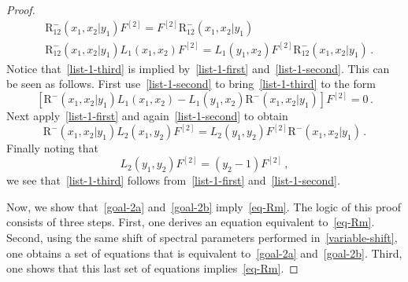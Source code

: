 \documentclass[11pt]{article}
\numberwithin{equation}{section}
\newcommand{\abrOSCR}{\mathrm{R}}
\begin{document}
\begin{proof}
\begin{align}
			&\abrOSCR_{12}^{-}(x_1,x_2|y_1)F^{[2]}=F^{[2]}\abrOSCR_{12}^{-}(x_1,x_2|y_1)\label{list-1-second}\\
			&\abrOSCR_{12}^{-}(x_1,x_2|y_1)L_{1}(x_{1},x_{2})F^{[2]}=L_{1}(y_{1},x_{2})F^{[2]}\abrOSCR_{12}^{-}(x_1,x_2|y_1)\label{list-1-third}\,.
		\end{align}
  Notice that~\eqref{list-1-third} is implied by~\eqref{list-1-first} and~\eqref{list-1-second}. This can be seen as follows.
   First use~\eqref{list-1-second} to bring~\eqref{list-1-third} to the form
   \begin{equation}
       \left[\abrOSCR^{-}(x_1,x_2|y_1)L_{1}(x_{1},x_{2})-L_{1}(y_{1},x_{2})\abrOSCR^{-}(x_1,x_2|y_1)\right]F^{[2]}=0\,.
   \end{equation}
   Next apply~\eqref{list-1-first} and again~\eqref{list-1-second} to obtain
 \begin{equation}
     \abrOSCR^{-}(x_1,x_2|y_1)L_{2}(x_{1},y_{2})F^{[2]}=L_{2}(y_{1},y_{2})F^{[2]}\abrOSCR^{-}(x_1,x_2|y_1)\,.
   \end{equation}
Finally  noting that
\begin{equation}
    L_{2}(y_{1},y_{2})F^{[2]}=(y_{2}-1)F^{[2]}\,,
\end{equation}
we see that~\eqref{list-1-third} follows from~\eqref{list-1-first} and~\eqref{list-1-second}.



   									   
                                                  	


					
   
Now, we show that~\eqref{goal-2a} and~\eqref{goal-2b} imply~\eqref{eq-Rm}.  The logic of this proof consists of three steps. First, one derives an equation equivalent to~\eqref{eq-Rm}. Second,  using the same shift of spectral parameters performed in~\eqref{variable-shift}, one obtains a set of equations that is equivalent to~\eqref{goal-2a} and~\eqref{goal-2b}. Third, one shows that this last set of equations implies~\eqref{eq-Rm}.


\end{proof}
\end{document}
